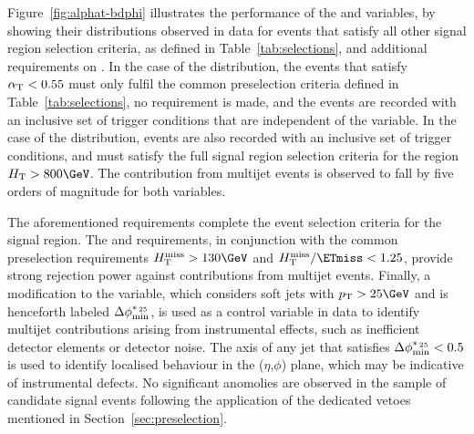 Figure~\ref{fig:alphat-bdphi} illustrates the performance of the
\alphat and \bdphi variables, by showing their distributions observed
in data for events that satisfy all other signal region selection
criteria, as defined in Table~\ref{tab:selections}, and additional
requirements on \scalht. In the case of the \alphat distribution, the
events that satisfy $\alphat < 0.55$ must only fulfil the common
preselection criteria defined in Table~\ref{tab:selections}, no
\HTmiss requirement is made, and the events are recorded with an
inclusive set of trigger \scalht conditions that are independent of
the \alphat variable. In the case of the \bdphi distribution, events
are also recorded with an inclusive set of trigger conditions, and
must satisfy the full signal region selection criteria for the region
$\scalht > 800\GeV$. The contribution from multijet events is observed
to fall by five orders of magnitude for both variables.

The aforementioned requirements complete the event selection criteria
for the signal region. The \alphat and \bdphi requirements, in
conjunction with the common preselection requirements $\HTmiss >
130\GeV$ and $\HTmiss / \ETmiss < 1.25$, provide strong rejection
power against contributions from multijet events. Finally, a
modification to the \bdphi variable, which considers soft jets with
$\Pt > 25\GeV$ and is henceforth labeled $\bdphimod$, is used as a
control variable in data to identify multijet contributions arising
from instrumental effects, such as inefficient detector elements or
detector noise. The axis of any jet that satisfies $\bdphimod < 0.5$
is used to identify localised behaviour in the ($\eta$,$\phi$) plane,
which may be indicative of instrumental defects. No significant
anomolies are observed in the sample of candidate signal events
following the application of the dedicated vetoes mentioned in
Section~\ref{sec:preselection}.


